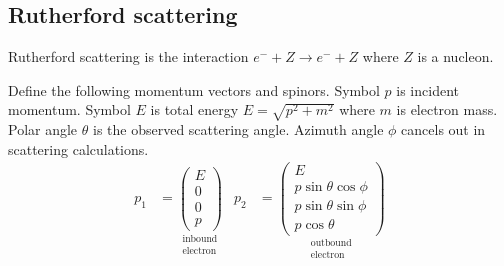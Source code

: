 \documentclass[12pt]{article}
\begin{document}
\subsection*{Rutherford scattering}
Rutherford scattering is the interaction $e^-+Z\rightarrow e^-+Z$ where $Z$ is a nucleon.

\begin{center}
\end{center}

Define the following momentum vectors and spinors.
Symbol $p$ is incident momentum.
Symbol $E$ is total energy $E=\sqrt{p^2+m^2}$ where $m$ is electron mass.
Polar angle $\theta$ is the observed scattering angle.
Azimuth angle $\phi$ cancels out in scattering calculations.
\begin{align*}
p_1&=
\underset{\substack{\text{inbound}\\\text{electron}}}
{
\begin{pmatrix}E\\0\\0\\p\end{pmatrix}
}
&
p_2&=
\underset{\substack{\text{outbound}\\\text{electron}}}
{
\begin{pmatrix}
E\\
p\sin\theta\cos\phi\\
p\sin\theta\sin\phi\\
p\cos\theta
\end{pmatrix}
}
\end{align*}
\end{document}
